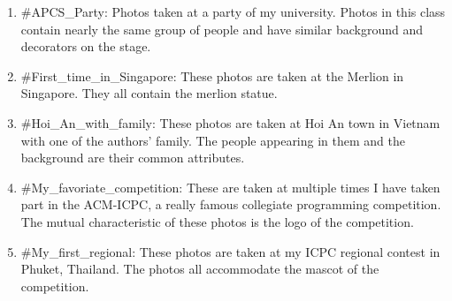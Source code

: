 \begin{enumerate}

\item \#APCS\_Party: Photos taken at a party of my university. Photos in this class contain nearly the same group of people and have similar background and decorators on the stage.
\item \#First\_time\_in\_Singapore: These photos are taken at the Merlion in Singapore. They all contain the merlion statue.
\item \#Hoi\_An\_with\_family: These photos are taken at Hoi An town in Vietnam with one of the authors' family. The people appearing in them and the background are their common attributes.
\item \#My\_favoriate\_competition: These are taken at multiple times I have taken part in the ACM-ICPC, a really famous collegiate programming competition. The mutual characteristic of these photos is the logo of the competition.
\item \#My\_first\_regional: These photos are taken at my ICPC regional contest in Phuket, Thailand. The photos all accommodate the mascot of the competition.

\end{enumerate}

